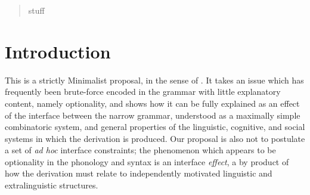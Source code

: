

\date{Received: date / Accepted: date}


\maketitle

\begin{abstract}
stuff
\end{abstract}

\section{Introduction}
\label{intro}

This is a strictly Minimalist proposal, in the sense of \citet{chomsky1993, chomsky1995, chomsky1998,chomsky2001}.
It takes an issue which has frequently been brute-force encoded in the grammar with little explanatory content, namely optionality, and shows how it can be fully explained as an effect of the interface between the narrow grammar, understood as a maximally simple combinatoric system, and general properties of the linguistic, cognitive, and social systems in which the derivation is produced.
Our proposal is also not to postulate a set of \textsl{ad hoc} interface constraints; the phenomenon which appears to be optionality in the phonology and syntax is an interface \textsl{effect}, a by product of how the derivation must relate to independently motivated linguistic and extralinguistic structures.


